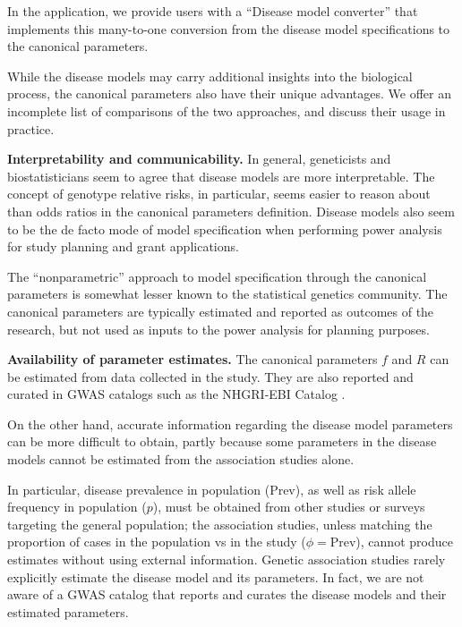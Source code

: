 In the application, we provide users with a ``Disease model converter'' that implements this many-to-one conversion from the disease model specifications to the canonical parameters.


\bigskip

While the disease models may carry additional insights into the biological process, the canonical parameters also have their unique advantages.
We offer an incomplete list of comparisons of the two approaches, and discuss their usage in practice.

\medskip\noindent
{\bf Interpretability and communicability.}
In general, geneticists and biostatisticians seem to agree that disease models are more interpretable.
The concept of genotype relative risks, in particular, seems easier to reason about than odds ratios in the canonical parameters definition.
Disease models also seem to be the de facto mode of model specification when performing power analysis for study planning and grant applications.

The ``nonparametric'' approach to model specification through the canonical parameters is somewhat lesser known to the statistical genetics community.
The canonical parameters are typically estimated and reported as outcomes of the research, but not used as inputs to the power analysis for planning purposes.

\medskip\noindent
{\bf Availability of parameter estimates.}
The canonical parameters $f$ and $R$ can be estimated from data collected in the study.
They are also reported and curated in GWAS catalogs such as the NHGRI-EBI Catalog \citep{macarthur2016new}.

On the other hand, accurate information regarding the disease model parameters can be more difficult to obtain, partly because some parameters in the disease models cannot be estimated from the association studies alone.

In particular, disease prevalence in population (Prev), as well as risk allele frequency in population ($p$), must be obtained from other studies or surveys targeting the general population; the association studies, unless matching the proportion of cases in the population vs in the study ($\phi=\text{Prev}$), cannot produce estimates without using external information.
Genetic association studies rarely explicitly estimate the disease model and its parameters.
In fact, we are not aware of a GWAS catalog that reports and curates the disease models and their estimated parameters.

